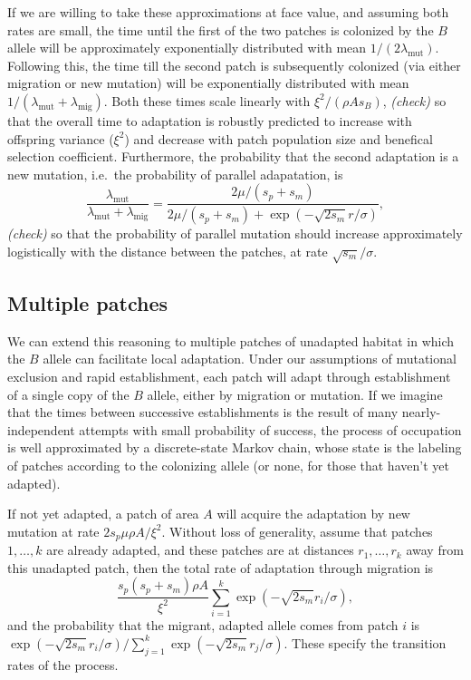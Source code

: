 \documentclass{article}
\newcommand{\migrate}{\lambda_\text{mig}}
\newcommand{\mutrate}{\lambda_\text{mut}}
\newcommand{\plr}[1]{{\it\color{blue}(#1)}}
\begin{document}
If we are willing to take these approximations at face value, 
and assuming both rates are small, 
the time until the first of the two patches is colonized by the $B$ allele will be approximately exponentially distributed with mean $1/(2 \mutrate)$.
Following this, the time till the second patch is subsequently colonized 
(via either migration or new mutation) 
will be exponentially distributed with mean $1/(\mutrate+\migrate)$.
Both these times scale linearly with $\xi^2/(\rho A s_{B})$, \plr{check}
so that the overall time to adaptation is robustly predicted to increase with offspring variance ($\xi^2$)
and decrease with patch population size and benefical selection coefficient.
Furthermore, the probability that the second adaptation is a new mutation,
i.e.\ the probability of parallel adapatation, is
\begin{equation}
  \frac{\mutrate}{\mutrate+\migrate} = \frac{2\mu/(s_p+s_m)}{2\mu/(s_p+s_m) + \exp\left(- \sqrt{2 s_m} r / \sigma \right) },
\end{equation}
\plr{check}
so that the probability of parallel mutation should increase
approximately logistically with the distance between the patches, at rate $\sqrt{s_m} /\sigma$. 



\subsection{Multiple patches}


We can extend this reasoning to multiple patches of unadapted habitat 
in which the $B$ allele can facilitate local adaptation. 
Under our assumptions of mutational exclusion and rapid establishment, 
each patch will adapt through establishment of a single copy of the $B$ allele, 
either by migration or mutation.
If we imagine that the times between successive establishments is the result of many nearly-independent attempts
with small probability of success,
the process of occupation is well approximated by a discrete-state Markov chain,
whose state is the labeling of patches according to the colonizing allele
(or none, for those that haven't yet adapted).

If not yet adapted,
a patch of area $A$ will acquire the adaptation by new mutation at rate $2 s_p \mu \rho A/\xi^2$.
Without loss of generality, assume that patches $1, \ldots, k$ are already adapted,
and these patches are at distances $r_1, \ldots, r_k$ away from this unadapted patch, 
then the total rate of adaptation through migration is
\begin{equation}
  \frac{ s_p (s_p+s_m) \rho A}{\xi^2} \sum_{i=1}^{k} \exp\left(- \sqrt{2 s_m} r_i/\sigma\right),
\end{equation}
and the probability that the migrant, adapted allele 
comes from patch $i$ is $\exp\left(- \sqrt{2 s_m} r_i/\sigma\right)/\sum_{j=1}^{k} \exp\left(- \sqrt{2 s_m} r_j/\sigma\right)$.
These specify the transition rates of the process.
\end{document}
